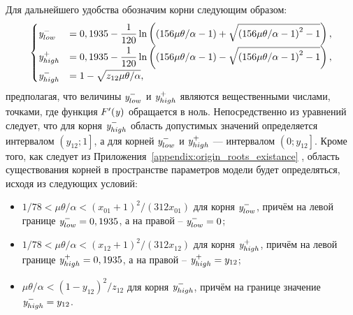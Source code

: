 Для дальнейшего удобства обозначим корни следующим образом:
\begin{equation}
    \begin{cases}
        \label{eq:origin_stability_bounds_y}
        \mathit{y}^{-}_{low}    &= 0,1935 - \dfrac{1}{120} \ln\left( \left( 156 \mu \theta / \alpha - 1\right) + \sqrt{\left( 156 \mu \theta / \alpha - 1\right)^{2} - 1} \right), \\
        \mathit{y}^{+}_{high}   &= 0,1935 - \dfrac{1}{120} \ln\left( \left( 156 \mu \theta / \alpha - 1\right) - \sqrt{\left( 156 \mu \theta / \alpha - 1\right)^{2} - 1} \right), \\
        \mathit{y}^{-}_{high}   &= 1 - \sqrt{z_{12} \mu \theta / \alpha}, \\
    \end{cases}
\end{equation}
предполагая, что величины $\mathit{y}^{-}_{low}$ и $\mathit{y}^{+}_{high}$ являются вещественными числами, \ie точками, где функция $F^{\prime}(\mathit{y})$ обращается в ноль. Непосредственно из уравнений следует, что для корня $\mathit{y}^{-}_{high}$ область допустимых значений определяется интервалом $\left(y_{12}; 1\right]$, а для корней $\mathit{y}^{-}_{low}$ и $\mathit{y}^{+}_{high}$ --- интервалом $\left(0; y_{12}\right]$. Кроме того, как следует из Приложения~\ref{appendix:origin_roots_existance} , область существования корней в пространстве параметров модели будет определяться, исходя из следующих условий:
\begin{itemize}
    \item $1 / 78 < \mu \theta / \alpha < (x_{01} + 1)^{2} / (312 x_{01})$ для корня $\mathit{y}^{-}_{low}$, причём на левой границе $\mathit{y}^{-}_{low} = 0,1935$, а на правой -- $\mathit{y}^{-}_{low} = 0$;
    \item $1 / 78 < \mu \theta / \alpha < (x_{12} + 1)^{2} / (312 x_{12})$ для корня $\mathit{y}^{+}_{high}$, причём на левой границе $\mathit{y}^{+}_{high} = 0,1935$, а на правой -- $\mathit{y}^{+}_{high} = y_{12}$;
    \item $\mu \theta / \alpha < \left(1 - y_{12}\right)^{2} / z_{12}$ для корня $\mathit{y}^{-}_{high}$, причём на границе значение $\mathit{y}^{-}_{high} = y_{12}$.
\end{itemize}

